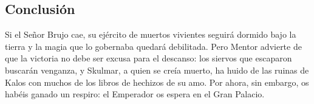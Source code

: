 \subsection*{Conclusión}

Si el Señor Brujo cae, su ejército de muertos vivientes seguirá dormido
bajo la tierra y la magia que lo gobernaba quedará debilitada. Pero Mentor
advierte de que la victoria no debe ser excusa para el descanso: los
siervos que escaparon buscarán venganza, y Skulmar, a quien se creía
muerto, ha huido de las ruinas de Kalos con muchos de los libros de
hechizos de su amo. Por ahora, sin embargo, os habéis ganado un respiro:
el Emperador os espera en el Gran Palacio.

